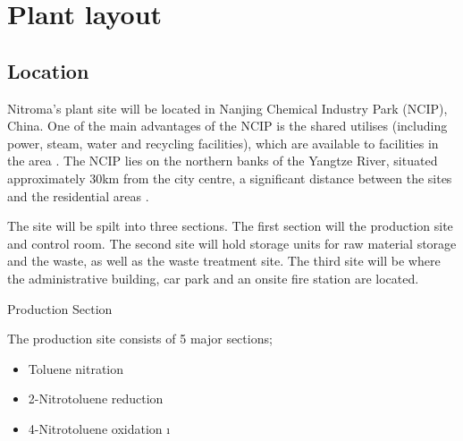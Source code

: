 \section{Plant layout}

\subsection{Location}

Nitroma’s plant site will be located in Nanjing Chemical Industry Park (NCIP), China. One of the main advantages of the NCIP is the shared utilises (including power, steam, water and recycling facilities), which are available to facilities in the area \cite{independent_commodity_intelligence_services_china_2007}. The NCIP lies on the northern banks of the Yangtze River, situated approximately 30km from the city centre, a significant distance between the sites and the residential areas \cite{zeng_divergent_2011}.   


The site will be spilt into three sections. The first section will the production site and control room. The second site will hold storage units for raw material storage and the waste, as well as the waste treatment site. The third site will be where the administrative building, car park and an onsite fire station are located. 

Production Section

The production site consists of 5 major sections; 

\begin{itemize}
    \item Toluene nitration
    \item 2-Nitrotoluene reduction 
    \item 4-Nitrotoluene oxidation 
    \i
\end{itemize}